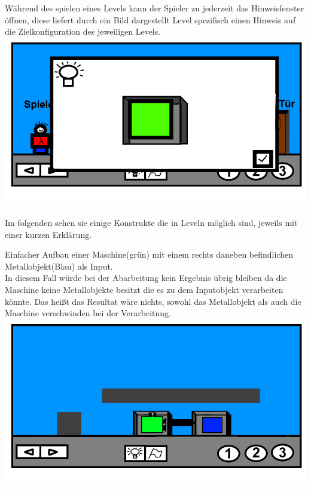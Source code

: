\documentclass{scrartcl}
\begin{document}
\begin{description}
\begin{enumerate}
		\begin{minipage}{1\textwidth}
			\item \label{Levelaufbau:Levelhinweis} Während des spielen eines Levels kann der Spieler zu jederzeit das Hinweisfenster öffnen, diese liefert durch ein Bild dargestellt Level spezifisch einen Hinweis auf die Zielkonfiguration des jeweiligen Levels.\\
			\includegraphics[scale=0.5]{assets/Levelhinweis}
		\end{minipage}
	\end{enumerate}
	
\clearpage

	\item[Konstrukte:] \label{Levelaufbau:Konstrukte} Im folgenden sehen sie einige Konstrukte die in Leveln möglich sind, jeweils mit einer kurzen Erklärung.\\
	
		\begin{minipage}{1\textwidth}
			Einfacher Aufbau einer Maschine(grün) mit einem rechts daneben befindlichen Metallobjekt(Blau) als Input.\\
			In diesem Fall würde bei der Abarbeitung kein Ergebnis übrig bleiben da die Maschine keine Metallobjekte besitzt die es zu dem Inputobjekt verarbeiten könnte. Das heißt das Resultat wäre nichts, sowohl das Metallobjekt als auch die Maschine verschwinden bei der Verarbeitung.\\
			\includegraphics[scale=0.5]{assets/LevelBsp1}
		\end{minipage}
		

\end{description}
\end{document}
